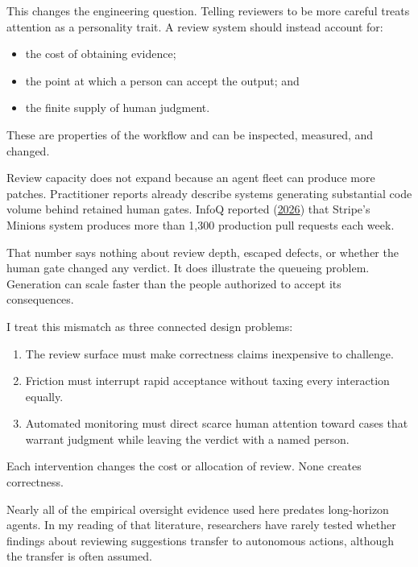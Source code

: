 
This changes the engineering question. Telling reviewers to be more careful treats attention as a personality trait. A review system should instead account for:

\begin{itemize}
\tightlist
\item
  the cost of obtaining evidence;
\item
  the point at which a person can accept the output; and
\item
  the finite supply of human judgment.
\end{itemize}

These are properties of the workflow and can be inspected, measured, and changed.

Review capacity does not expand because an agent fleet can produce more patches. Practitioner reports already describe systems generating substantial code volume behind retained human gates. InfoQ reported (\href{https://www.infoq.com/news/2026/03/stripe-autonomous-coding-agents/}{2026}) that Stripe's Minions system produces more than 1,300 production pull requests each week.

That number says nothing about review depth, escaped defects, or whether the human gate changed any verdict. It does illustrate the queueing problem. Generation can scale faster than the people authorized to accept its consequences.


I treat this mismatch as three connected design problems:

\begin{enumerate}
\def\labelenumi{\arabic{enumi}.}
\tightlist
\item
  The review surface must make correctness claims inexpensive to challenge.
\item
  Friction must interrupt rapid acceptance without taxing every interaction equally.
\item
  Automated monitoring must direct scarce human attention toward cases that warrant judgment while leaving the verdict with a named person.
\end{enumerate}

Each intervention changes the cost or allocation of review. None creates correctness.

Nearly all of the empirical oversight evidence used here predates long-horizon agents. In my reading of that literature, researchers have rarely tested whether findings about reviewing suggestions transfer to autonomous actions, although the transfer is often assumed.

